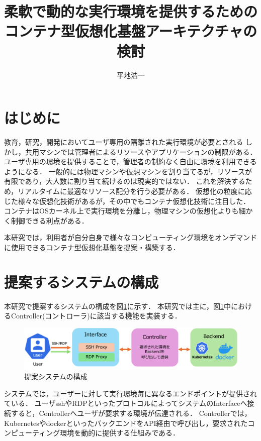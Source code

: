 \documentclass[dvipdfmx]{cs-handout}
\title{柔軟で動的な実行環境を提供するための\\コンテナ型仮想化基盤アーキテクチャの検討}
\author{平地浩一}
\newcommand{\Note}[1]{\noindent \textbf{\textcolor{blue}{#1}}}
\begin{document}
\maketitle

\section{はじめに}

教育，研究，開発においてユーザ専用の隔離された実行環境が必要とされる 
しかし，共用マシンでは管理者によるリソースやアプリケーションの制限がある．
ユーザ専用の環境を提供することで，管理者の制約なく自由に環境を利用できるようになる．
一般的には物理マシンや仮想マシンを割り当てるが，リソースが有限であり，大人数に割り当て続けるのは現実的ではない．
これを解決するため，リアルタイムに最適なリソース配分を行う必要がある．
仮想化の粒度に応じた様々な仮想化技術があるが，その中でもコンテナ仮想化技術に注目した．
コンテナはOSカーネル上で実行環境を分離し，物理マシンの仮想化よりも細かく制御できる利点がある．

本研究では，利用者が自分自身で様々なコンピューティング環境をオンデマンドに使用できるコンテナ型仮想化基盤を提案・構築する．

\section{提案するシステムの構成}

本研究で提案するシステムの構成を図\ref{fig:system}に示す．
本研究では主に，図\ref{fig:system}中におけるController(コントローラ)に該当する機能を実装する．
%
\begin{figure}[htbp]
\includegraphics[width=\linewidth]{./fig/simple.png}
\caption{提案システムの構成}
\label{fig:system}
\end{figure}
%

システムでは，ユーザーに対して実行環境毎に異なるエンドポイントが提供されている．
ユーザsshやRDPといったプロトコルによってシステムのInterfaceへ接続すると，Controllerへユーザが要求する環境が伝達される．
Controllerでは，KubernetesやdockerといったバックエンドをAPI経由で呼び出し，要求されたコンピューティング環境を動的に提供する仕組みである．
\end{document}
